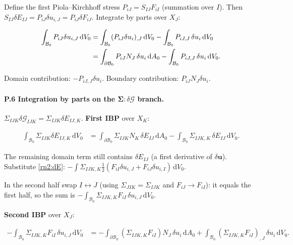 \documentclass[11pt]{article}
\begin{document}
Define the first Piola--Kirchhoff stress $P_{iJ}=S_{IJ}F_{iI}$ (summation over $I$). Then $S_{IJ}\delta E_{IJ}=P_{iJ}\delta u_{i,J}=P_{iJ}\delta F_{iJ}$. Integrate by parts over $X_J$:

\begin{align}
\int_{\mathcal{B}_0}P_{iJ}\delta u_{i,J}\,\mathrm{d}V_0
&= \int_{\mathcal{B}_0}(P_{iJ}\delta u_i)_{,J}\,\mathrm{d}V_0
 - \int_{\mathcal{B}_0}P_{iJ,J}\,\delta u_i\,\mathrm{d}V_0 \notag\\
&= \int_{\partial\mathcal{B}_0}P_{iJ}N_J\,\delta u_i\,\mathrm{d}A_0
 - \int_{\mathcal{B}_0}P_{iJ,J}\,\delta u_i\,\mathrm{d}V_0.
\label{rn2:ibpS}
\end{align}

Domain contribution: $-P_{iJ,J}\delta u_i$. Boundary contribution: $P_{iJ}N_J\delta u_i$. \checkmark

\paragraph{P.6 Integration by parts on the $\boldsymbol{\Sigma}:\delta\bm{\mathcal{G}}$ branch.}

$\Sigma_{IJK}\delta\mathcal{G}_{IJK}=\Sigma_{IJK}\delta E_{IJ,K}$. \textbf{First IBP} over $X_K$:

\begin{align}
\int_{\mathcal{B}_0}\Sigma_{IJK}\delta E_{IJ,K}\,\mathrm{d}V_0
&= \int_{\partial\mathcal{B}_0}\Sigma_{IJK}N_K\,\delta E_{IJ}\,\mathrm{d}A_0
 - \int_{\mathcal{B}_0}\Sigma_{IJK,K}\,\delta E_{IJ}\,\mathrm{d}V_0.
\label{rn2:ibpSig1}
\end{align}

The remaining domain term still contains $\delta E_{IJ}$ (a first derivative of $\delta\mathbf{u}$). Substitute \eqref{rn2:dE}:
$-\int\Sigma_{IJK,K}\tfrac12(F_{iI}\delta u_{i,J}+F_{iJ}\delta u_{i,I})\,\mathrm{d}V_0$.

In the second half swap $I\leftrightarrow J$ (using $\Sigma_{JIK}=\Sigma_{IJK}$ and $F_{iJ}\to F_{iI}$): it equals the first half, so the sum is
$-\int_{\mathcal{B}_0}\Sigma_{IJK,K}F_{iI}\,\delta u_{i,J}\,\mathrm{d}V_0$.

\textbf{Second IBP} over $X_J$:

\begin{align}
-\int_{\mathcal{B}_0}\Sigma_{IJK,K}F_{iI}\,\delta u_{i,J}\,\mathrm{d}V_0
&= -\int_{\partial\mathcal{B}_0}(\Sigma_{IJK,K}F_{iI})N_J\,\delta u_i\,\mathrm{d}A_0
 + \int_{\mathcal{B}_0}(\Sigma_{IJK,K}F_{iI})_{,J}\,\delta u_i\,\mathrm{d}V_0.
\label{rn2:ibpSig2}
\end{align}
\end{document}
